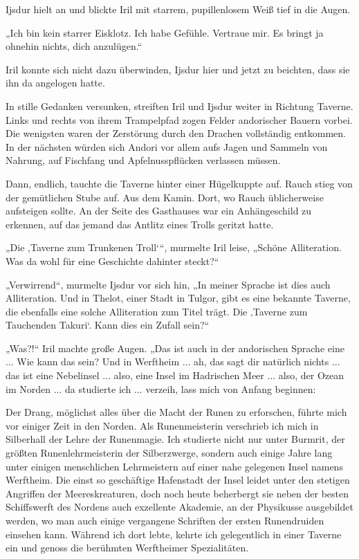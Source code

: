 Ijsdur hielt an und blickte Iril mit starrem, pupillenlosem Weiß tief in die Augen.

„Ich bin kein starrer Eisklotz. Ich habe Gefühle. Vertraue mir. Es bringt ja ohnehin nichts, dich anzulügen.“

Iril konnte sich nicht dazu überwinden, Ijsdur hier und jetzt zu beichten, dass sie ihn da angelogen hatte.



\trennzeichen



In stille Gedanken versunken, streiften Iril und Ijsdur weiter in Richtung Taverne. Links und rechts von ihrem Trampelpfad zogen Felder andorischer Bauern vorbei. Die wenigsten waren der Zerstörung durch den Drachen vollständig entkommen. In der nächsten würden sich Andori vor allem aufs Jagen und Sammeln von Nahrung, auf Fischfang und Apfelnusspflücken verlassen müssen.

Dann, endlich, tauchte die Taverne hinter einer Hügelkuppte auf. Rauch stieg von der gemütlichen Stube auf. Aus dem Kamin. Dort, wo Rauch üblicherweise aufsteigen sollte. An der Seite des Gasthauses war ein Anhängeschild zu erkennen, auf das jemand das Antlitz eines Trolls geritzt hatte.

„Die ‚Taverne zum Trunkenen Troll‘“, murmelte Iril leise, „Schöne Alliteration. Was da wohl für eine Geschichte dahinter steckt?“

„Verwirrend“, murmelte Ijsdur vor sich hin, „In meiner Sprache ist dies auch Alliteration. Und in Thelot, einer Stadt in Tulgor, gibt es eine bekannte Taverne, die ebenfalls eine solche Alliteration zum Titel trägt. Die ‚Taverne zum Tauchenden Takuri‘. Kann dies ein Zufall sein?“

„Was?!“ Iril machte große Augen. „Das ist auch in der andorischen Sprache eine ... Wie kann das sein? Und in Werftheim ... ah, das sagt dir natürlich nichts ... das ist eine Nebelinsel ... also, eine Insel im Hadrischen Meer ... also, der Ozean im Norden ... da studierte ich ... verzeih, lass mich von Anfang beginnen:

Der Drang, möglichst alles über die Macht der Runen zu erforschen, führte mich vor einiger Zeit in den Norden. Als Runenmeisterin verschrieb ich mich in Silberhall der Lehre der Runenmagie. Ich studierte nicht nur unter Burmrit, der größten Runenlehrmeisterin der Silberzwerge, sondern auch einige Jahre lang unter einigen menschlichen Lehrmeistern auf einer nahe gelegenen Insel namens Werftheim. Die einst so geschäftige Hafenstadt der Insel leidet unter den stetigen Angriffen der Meereskreaturen, doch noch heute beherbergt sie neben der besten Schiffswerft des Nordens auch exzellente Akademie, an der Physikusse ausgebildet werden, wo man auch einige vergangene Schriften der ersten Runendruiden einsehen kann. Während ich dort lebte, kehrte ich gelegentlich in einer Taverne ein und genoss die berühmten Werftheimer Spezialitäten.

